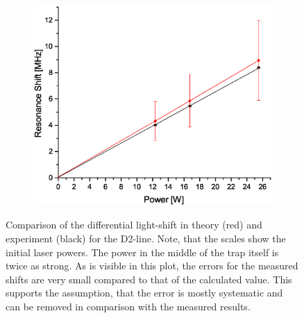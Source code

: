 \begin{figure}[H]
\centering
\begin{subfigure}[b]{0.8\textwidth}
                \includegraphics[width=\textwidth]{Shift2}
\end{subfigure}
\caption{Comparison of the differential light-shift in theory (red) and experiment (black) for the D2-line. Note, that the scales show the initial laser powers. The power in the middle of the trap itself is twice as strong. As is visible in this plot, the errors for the measured shifts are very small compared to that of the calculated value. This supports the assumption, that the error is mostly systematic and can be removed in comparison with the measured results.}
\label{shifts}
\end{figure}


